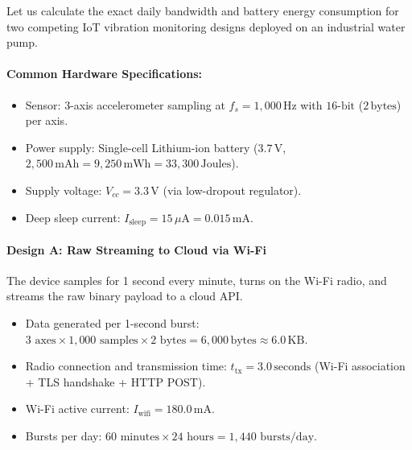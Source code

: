\begin{example}
Let us calculate the exact daily bandwidth and battery energy consumption for two competing IoT vibration monitoring designs deployed on an industrial water pump.

\paragraph{Common Hardware Specifications:}
\begin{itemize}
    \item Sensor: 3-axis accelerometer sampling at $f_s = 1{,}000\,\text{Hz}$ with $16\text{-bit}$ ($2\,\text{bytes}$) per axis.
    \item Power supply: Single-cell Lithium-ion battery ($3.7\,\text{V}$, $2{,}500\,\text{mAh} = 9{,}250\,\text{mWh} = 33{,}300\,\text{Joules}$).
    \item Supply voltage: $V_{cc} = 3.3\,\text{V}$ (via low-dropout regulator).
    \item Deep sleep current: $I_{\text{sleep}} = 15\,\mu\text{A} = 0.015\,\text{mA}$.
\end{itemize}

\paragraph{Design A: Raw Streaming to Cloud via Wi-Fi}
The device samples for 1 second every minute, turns on the Wi-Fi radio, and streams the raw binary payload to a cloud API.
\begin{itemize}
    \item Data generated per 1-second burst: $3 \text{ axes} \times 1{,}000 \text{ samples} \times 2 \text{ bytes} = 6{,}000\,\text{bytes} \approx 6.0\,\text{KB}$.
    \item Radio connection and transmission time: $t_{\text{tx}} = 3.0\,\text{seconds}$ (Wi-Fi association + TLS handshake + HTTP POST).
    \item Wi-Fi active current: $I_{\text{wifi}} = 180.0\,\text{mA}$.
    \item Bursts per day: $60 \text{ minutes} \times 24 \text{ hours} = 1{,}440 \text{ bursts/day}$.
\end{itemize}


\end{example}
